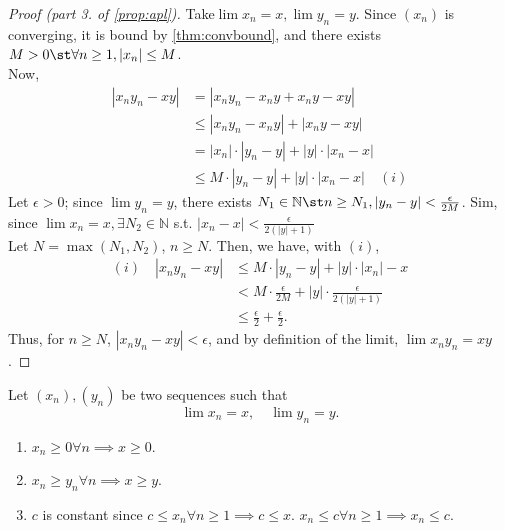 \documentclass[12pt]{article}
\begin{document}
\begin{proof}[Proof (part 3. of \cref{prop:apl})]
  Take\footnotemark $\lim x_n = x, \lim y_n = y$. Since $(x_n)$ is converging, it is bound by \cref{thm:convbound}, and there exists $M > 0 \st \forall n \geq 1, |x_n| \leq M$.\\
  Now, \begin{align*}
    |x_n y_n - xy| &= |x_n y_n - x_n y + x_n y - xy|\\
    & \leq |x_n y_n - x_n y| + |x_n y - xy|\\
    &= |x_n| \cdot |y_n - y| + |y|\cdot |x_n - x|\\
    &\leq M \cdot |y_n - y| + |y|\cdot |x_n -x| \quad (i)
  \end{align*}
  Let $\epsilon > 0$; since $\lim y_n = y$, there exists $N_1 \in \mathbb{N} \st n \geq N_1, |y_n - y| < \frac{\epsilon}{2M}$. Sim, since $\lim x_n = x, \exists N_2 \in \mathbb{N}$ s.t. $|x_n - x|  <\frac{\epsilon}{2(|y|+1)}$\\
  Let $N = \max (N_1, N_2)$, $n \geq N$. Then, we have, with $(i)$,
  \begin{align*}
    (i) \quad |x_n y_n - xy| &\leq M\cdot |y_n - y| + |y| \cdot |x_n| - x\\
    &< M\cdot \frac{\epsilon}{2M} + |y|\cdot \frac{\epsilon}{2 (|y|+1)}\\
    &\leq \frac{\epsilon}{2} + \frac{\epsilon}{2}.
  \end{align*}
  Thus, for $n \geq N$, $|x_n y_n - xy| < \epsilon$, and by definition of the limit, $\lim x_n y_n = xy$.
\end{proof}

\begin{theorem}\label{thm:orderpropertiesoflimits}
  Let $(x_n), (y_n)$ be two sequences such that \[\lim x_n = x, \quad \lim y_n = y.\]
  \begin{enumerate}
    \item $x_n \geq 0 \forall n \implies x \geq 0$.
    \item $x_n \geq y_n \forall n \implies x \geq y$.
    \item $c$ is constant since $c \leq x_n \forall n \geq 1 \implies c \leq x$. $x_n \leq c \forall n \geq 1 \implies x_n \leq c$.
  \end{enumerate}
\end{theorem}
\end{document}
